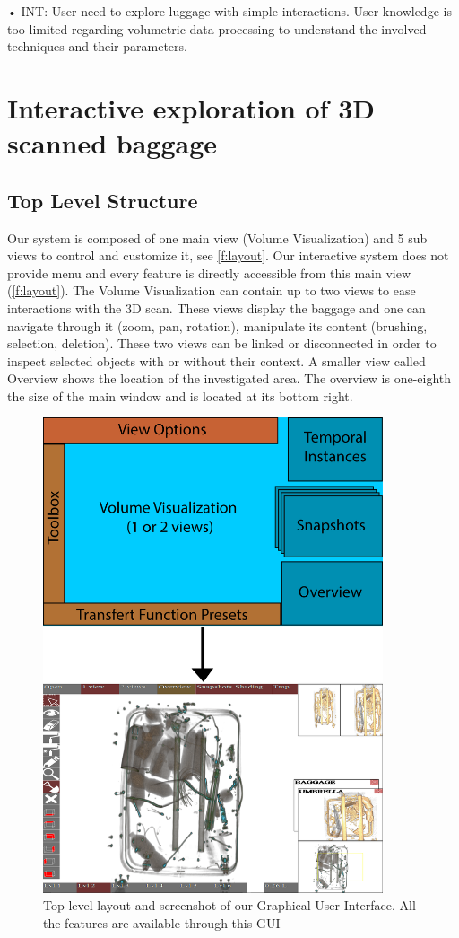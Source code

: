 •	INT: User need to explore luggage with simple interactions. User knowledge is too limited regarding volumetric data processing to understand the involved techniques and their parameters.

\section{ Interactive exploration of 3D scanned baggage }

\subsection{Top Level Structure}

Our system is composed of one main view (Volume Visualization) and 5 sub views to control and customize it, see  \autoref{f:layout}. Our interactive system does not provide menu and every feature is directly accessible from this main view (\autoref{f:layout}).
The Volume Visualization can contain up to two views to ease interactions with the 3D scan. These views display the baggage and one can navigate through it (zoom, pan, rotation), manipulate its content (brushing, selection, deletion). These two views can be linked or disconnected in order to inspect selected objects with or without their context.
A smaller view called Overview shows the location of the investigated area. The overview is one-eighth the size of the main window and is located at its bottom right.
\begin{figure}
\centering
	\includegraphics[height=14cm]{Figures/layout}
	\caption{Top level layout and screenshot of our Graphical User Interface. All the features are available through this GUI}
	\label{f:layout}
\end{figure}

